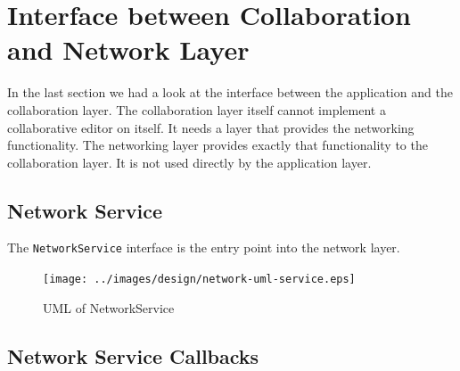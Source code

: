 \section{Interface between Collaboration and Network Layer}
In the last section we had a look at the interface between the application and
the collaboration layer. The collaboration layer itself cannot implement a
collaborative editor on itself. It needs a layer that provides the networking
functionality. The networking layer provides exactly that functionality to
the collaboration layer. It is not used directly by the application layer.

\subsection{Network Service}
The \texttt{NetworkService} interface is the entry point into the network layer.

\begin{figure}[H]
 \centering
 \texttt{[image: ../images/design/network-uml-service.eps]}
 \caption{UML of NetworkService}
 \label{fig:networkservice interface}
\end{figure}

\subsection{Network Service Callbacks}

